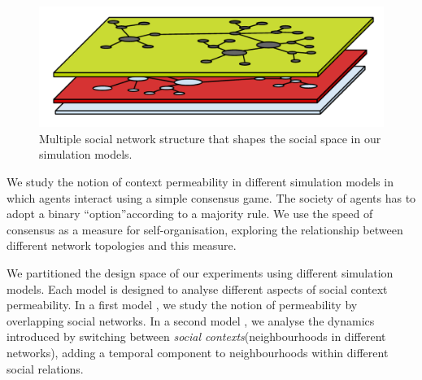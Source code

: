 \documentclass[preprint,number]{elsarticle}
\begin{document}
	
	
	\begin{figure}[h]
		\centering
		\includegraphics[width=0.7\linewidth]{./images/multi-context_model.pdf}
		\begin{minipage}{0.9\linewidth}
			\caption{Multiple social network structure that shapes the social space in our simulation models.}
			\label{img:multiple-relations}
		\end{minipage}
	\end{figure}
	
	We study the notion of context permeability in different simulation models in which agents interact using a simple consensus game. The society of agents has to adopt a binary \textquotedblleft option\textquotedblright according to a majority rule. We use the speed of consensus as a measure for self-organisation, exploring the relationship between different network topologies and this measure.
	
	We partitioned the design space of our experiments using different simulation models. Each model is designed to analyse different aspects of social context permeability. In a first model \cite{Antunes2007, Antunes2010}, we study the notion of permeability by overlapping social networks. In a second model \cite{Antunes2009}, we analyse the dynamics introduced by switching between \textit{social contexts}(neighbourhoods in different networks), adding a temporal component to neighbourhoods within different social relations. 
	
\end{document}
